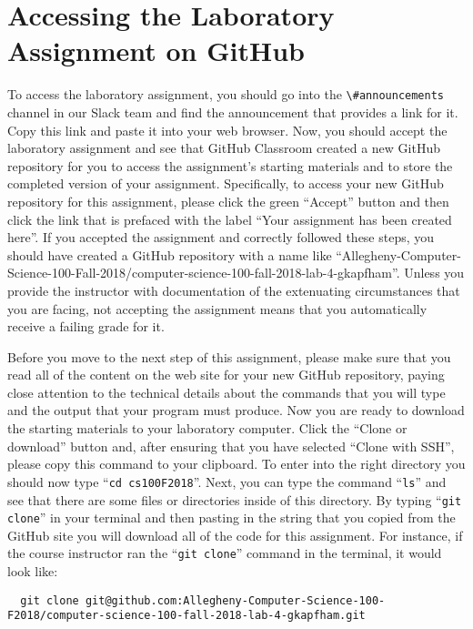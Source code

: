 \documentclass[11pt]{article}
\newcommand{\command}[1]{``\lstinline{#1}''}
\newcommand{\channel}[1]{\lstinline{#1}}
\begin{document}
\section*{Accessing the Laboratory Assignment on GitHub}

To access the laboratory assignment, you should go into the
\channel{\#announcements} channel in our Slack team and find the announcement
that provides a link for it. Copy this link and paste it into your web browser.
Now, you should accept the laboratory assignment and see that GitHub Classroom
created a new GitHub repository for you to access the assignment's starting
materials and to store the completed version of your assignment. Specifically,
to access your new GitHub repository for this assignment, please click the green
``Accept'' button and then click the link that is prefaced with the label ``Your
assignment has been created here''. If you accepted the assignment and correctly
followed these steps, you should have created a GitHub repository with a name
like
``Allegheny-Computer-Science-100-Fall-2018/computer-science-100-fall-2018-lab-4-gkapfham''.
Unless you provide the instructor with documentation of the extenuating
circumstances that you are facing, not accepting the assignment means that you
automatically receive a failing grade for it.

Before you move to the next step of this assignment, please make sure that you
read all of the content on the web site for your new GitHub repository, paying
close attention to the technical details about the commands that you will type
and the output that your program must produce. Now you are ready to download the
starting materials to your laboratory computer. Click the ``Clone or download''
button and, after ensuring that you have selected ``Clone with SSH'', please
copy this command to your clipboard. To enter into the right directory you
should now type \command{cd cs100F2018}. Next, you can type the command
\command{ls} and see that there are some files or directories inside of this
directory. By typing \command{git clone} in your terminal and then pasting in
the string that you copied from the GitHub site you will download all of the
code for this assignment. For instance, if the course instructor ran the
\command{git clone} command in the terminal, it would look like:

\begin{lstlisting}
  git clone git@github.com:Allegheny-Computer-Science-100-F2018/computer-science-100-fall-2018-lab-4-gkapfham.git
\end{lstlisting}
\end{document}
